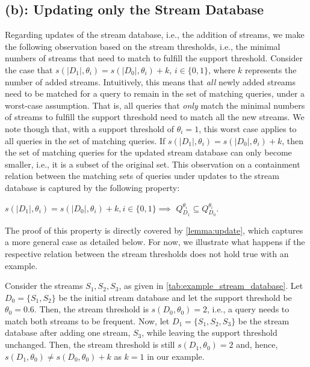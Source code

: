 \subsection*{(b): Updating only the Stream Database}
\label{subsubsec:stream_update}
Regarding updates of the stream database, i.e., the
addition of streams, we make the
following observation based on the stream
thresholds, i.e., the minimal numbers of streams that
need to match to fulfill the support threshold.
Consider the case that $s(|D_1|,\theta_i) =
s(|D_0|,\theta_i) + k$, $i\in \{0,1\}$, where
$k$ represents the number of added streams.
Intuitively, this means that
\emph{all} newly added streams need to be matched for
a query to remain in the set of matching queries,
under a worst-case assumption. That is, all queries
that \emph{only} match the minimal numbers of streams
to fulfill the support threshold need to match all the
new streams. We note though that, with a support
threshold of $\theta_i=1$, this worst case applies to
all queries in the set of matching queries.
If $s(|D_1|,\theta_i) =
s(|D_0|,\theta_i) + k$, then the set of
matching queries for
the updated stream database can only become smaller,
i.e., it is
a subset of the original set. This observation on a
containment relation between the matching sets of
queries under updates to the stream database is
captured by the following property:
\begin{property}
\label{prop:db_change_inclusion}
$s(|D_1|,\theta_i) = s(|D_0|,\theta_i) + k, i\in\{0,1\} \implies $
$Q_{D_1}^{\theta_i} \subseteq Q_{D_0}^{\theta_i}$.
\end{property}
The proof of this property is directly covered by \autoref{lemma:update},
which captures a more general case as detailed below. For now, we illustrate
what happens if the respective relation between the stream thresholds does
not hold true with an example.

Consider the streams $S_1, S_2, S_3$, as given in
\autoref{tab:example_stream_database}.
Let $D_0=\{S_1,S_2\}$ be the initial stream database and let the support
threshold be $\theta_0 = 0.6$. Then, the stream threshold is
$s(D_0,\theta_0) = 2$, i.e., a query needs to match both streams to be
frequent. Now, let $D_1=\{S_1,S_2,S_3\}$ be the stream database after adding
one stream, $S_3$, while leaving the support threshold unchanged. Then, the
stream threshold is still $s(D_1,\theta_0) = 2$ and, hence,
$s(D_1,\theta_0)\neq s(D_0,\theta_0) +k$ as $k=1$ in our example.

